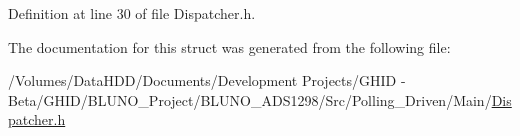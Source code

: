\-Definition at line 30 of file \-Dispatcher.\-h.



\-The documentation for this struct was generated from the following file\-:\begin{DoxyCompactItemize}
\item 
/\-Volumes/\-Data\-H\-D\-D/\-Documents/\-Development Projects/\-G\-H\-I\-D -\/ Beta/\-G\-H\-I\-D/\-B\-L\-U\-N\-O\-\_\-\-Project/\-B\-L\-U\-N\-O\-\_\-\-A\-D\-S1298/\-Src/\-Polling\-\_\-\-Driven/\-Main/\hyperlink{_dispatcher_8h}{\-Dispatcher.\-h}\end{DoxyCompactItemize}
